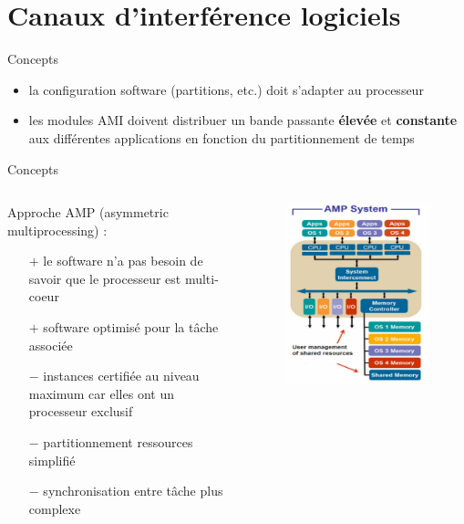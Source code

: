 \documentclass{beamer}
\begin{document}
\section[CI logiciels]{Canaux d'interférence logiciels}

\begin{frame}{Concepts}
	\begin{itemize}
		\item la configuration software (partitions, etc.) doit s'adapter au processeur
		\item les modules AMI doivent distribuer un bande passante \textbf{élevée} et
			\textbf{constante} aux différentes applications en fonction du partitionnement
			de temps
	\end{itemize}
\end{frame}

\begin{frame}{Concepts}
	\begin{columns}
		\begingroup
		\small
		\hspace{0.3cm}
		\begin{column}{0.55\paperwidth}
			Approche AMP (asymmetric multi\-processing) :
				\begin{itemize}
					\item[$+$] le software n'a pas besoin de savoir que le processeur est
						multi-coeur
					\item[$+$] software optimisé pour la tâche associée
					\item[$-$] instances certifiée au niveau maximum car elles ont un
						processeur exclusif 
					\item[$-$] partitionnement ressources simplifié
					\item[$-$] synchronisation entre tâche plus complexe
				\end{itemize}
		\end{column}
		\endgroup
		\begin{column}{0.45\paperwidth}
			\begin{figure}
				\centering
				\includegraphics[width=0.7\linewidth]{amp.png}

\end{figure}
\end{column}
\end{columns}
\end{frame}
\end{document}
